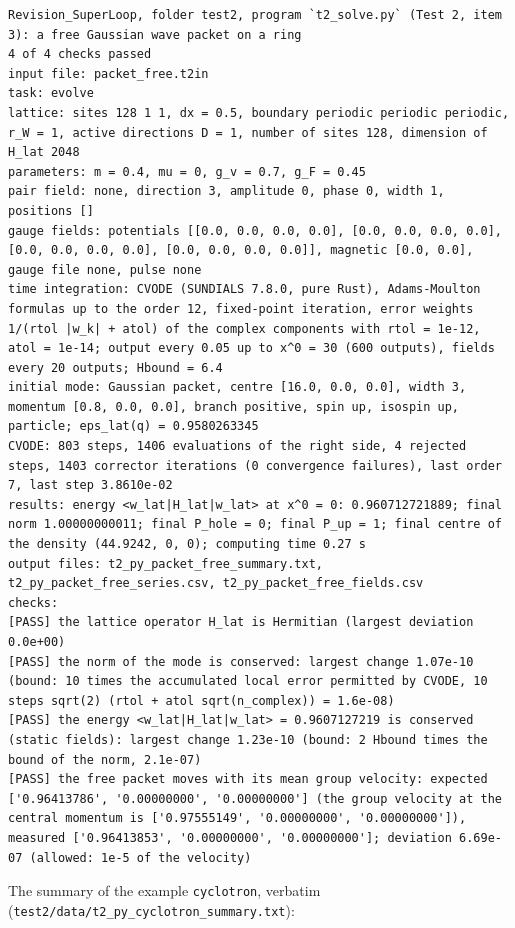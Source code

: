 \documentclass[
  10pt,
]{article}
\begin{document}
\begin{verbatim}
Revision_SuperLoop, folder test2, program `t2_solve.py` (Test 2, item 3): a free Gaussian wave packet on a ring
4 of 4 checks passed
input file: packet_free.t2in
task: evolve
lattice: sites 128 1 1, dx = 0.5, boundary periodic periodic periodic, r_W = 1, active directions D = 1, number of sites 128, dimension of H_lat 2048
parameters: m = 0.4, mu = 0, g_v = 0.7, g_F = 0.45
pair field: none, direction 3, amplitude 0, phase 0, width 1, positions []
gauge fields: potentials [[0.0, 0.0, 0.0, 0.0], [0.0, 0.0, 0.0, 0.0], [0.0, 0.0, 0.0, 0.0], [0.0, 0.0, 0.0, 0.0]], magnetic [0.0, 0.0], gauge file none, pulse none
time integration: CVODE (SUNDIALS 7.8.0, pure Rust), Adams-Moulton formulas up to the order 12, fixed-point iteration, error weights 1/(rtol |w_k| + atol) of the complex components with rtol = 1e-12, atol = 1e-14; output every 0.05 up to x^0 = 30 (600 outputs), fields every 20 outputs; Hbound = 6.4
initial mode: Gaussian packet, centre [16.0, 0.0, 0.0], width 3, momentum [0.8, 0.0, 0.0], branch positive, spin up, isospin up, particle; eps_lat(q) = 0.9580263345
CVODE: 803 steps, 1406 evaluations of the right side, 4 rejected steps, 1403 corrector iterations (0 convergence failures), last order 7, last step 3.8610e-02
results: energy <w_lat|H_lat|w_lat> at x^0 = 0: 0.960712721889; final norm 1.00000000011; final P_hole = 0; final P_up = 1; final centre of the density (44.9242, 0, 0); computing time 0.27 s
output files: t2_py_packet_free_summary.txt, t2_py_packet_free_series.csv, t2_py_packet_free_fields.csv
checks:
[PASS] the lattice operator H_lat is Hermitian (largest deviation 0.0e+00)
[PASS] the norm of the mode is conserved: largest change 1.07e-10 (bound: 10 times the accumulated local error permitted by CVODE, 10 steps sqrt(2) (rtol + atol sqrt(n_complex)) = 1.6e-08)
[PASS] the energy <w_lat|H_lat|w_lat> = 0.9607127219 is conserved (static fields): largest change 1.23e-10 (bound: 2 Hbound times the bound of the norm, 2.1e-07)
[PASS] the free packet moves with its mean group velocity: expected ['0.96413786', '0.00000000', '0.00000000'] (the group velocity at the central momentum is ['0.97555149', '0.00000000', '0.00000000']), measured ['0.96413853', '0.00000000', '0.00000000']; deviation 6.69e-07 (allowed: 1e-5 of the velocity)
\end{verbatim}

The summary of the example \texttt{cyclotron}, verbatim
(\texttt{test2/data/t2\_py\_cyclotron\_summary.txt}):
\end{document}
